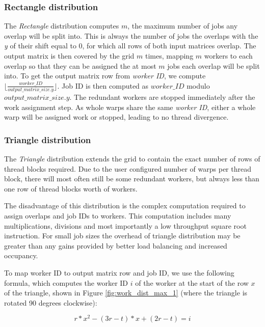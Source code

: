 \subsubsection{Rectangle distribution}

The \textit{Rectangle} distribution computes $m$, the maximum number of jobs any overlap will be split into. This is always the number of jobs the overlaps with the \textit{y} of their shift equal to $0$, for which all rows of both input matrices overlap. The output matrix is then covered by the grid $m$ times, mapping $m$ workers to each overlap so that they can be assigned the at most $m$ jobs each overlap will be split
into. To get the output matrix row from \textit{worker ID}, we compute $\lfloor\frac{worker\_ID}{output\_matrix\_size.y}\rfloor$. Job ID is then computed as $worker\_ID$ modulo $output\_matrix\_size.y$. The redundant workers are stopped immediately after the work assignment step. As whole warps share the same \textit{worker ID}, either a whole warp will be assigned work or stopped, leading to no thread divergence. 

\subsubsection{Triangle distribution}
The \textit{Triangle} distribution extends the grid to contain the exact number of rows of thread blocks required. Due to the user configured number of warps per thread block, there will most often still be some redundant workers, but always less than one row of thread blocks worth of workers.

The disadvantage of this distribution is the complex computation required to assign overlaps and job IDs to workers. This computation includes many multiplications, divisions and most importantly a low throughput square root instruction. For small job sizes the overhead of triangle distribution may be greater than any gains provided by better load balancing and increased occupancy. 

To map worker ID to output matrix row and job ID, we use the following formula, which computes the worker ID $i$ of the worker at the start of the row $x$ of the triangle, shown in Figure \ref{fig:work_dist_max_1} (where the triangle is rotated 90 degrees clockwise):

\begin{equation}
\label{eq:first_row_worker}
	r*x^2 - (3r - t)*x + (2r - t) = i
\end{equation}


